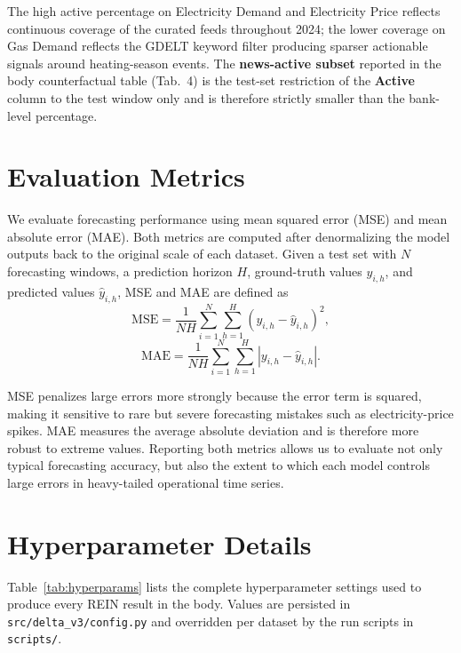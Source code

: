 \documentclass{article}
\newcommand{\method}{REIN\xspace}
\begin{document}
The high active percentage on Electricity Demand and Electricity Price reflects continuous coverage of the curated feeds throughout 2024; the lower coverage on Gas Demand reflects the GDELT keyword filter producing sparser actionable signals around heating-season events. The \textbf{news-active subset} reported in the body counterfactual table (Tab.~4) is the test-set restriction of the \textbf{Active} column to the test window only and is therefore strictly smaller than the bank-level percentage.
\section{Evaluation Metrics}
\label{app:evaluation}
We evaluate forecasting performance using mean squared error (MSE) and mean absolute error (MAE). 
Both metrics are computed after denormalizing the model outputs back to the original scale of each dataset. 
Given a test set with $N$ forecasting windows, a prediction horizon $H$, ground-truth values $y_{i,h}$, and predicted values $\hat{y}_{i,h}$, MSE and MAE are defined as
\[
\mathrm{MSE}
=
\frac{1}{NH}
\sum_{i=1}^{N}
\sum_{h=1}^{H}
\left(y_{i,h}-\hat{y}_{i,h}\right)^2,
\]
\[
\mathrm{MAE}
=
\frac{1}{NH}
\sum_{i=1}^{N}
\sum_{h=1}^{H}
\left|y_{i,h}-\hat{y}_{i,h}\right|.
\]

MSE penalizes large errors more strongly because the error term is squared, making it sensitive to rare but severe forecasting mistakes such as electricity-price spikes. MAE measures the average absolute deviation and is therefore more robust to extreme values. Reporting both metrics allows us to evaluate not only typical forecasting accuracy, but also the extent to which each model controls large errors in heavy-tailed operational time series.

\section{Hyperparameter Details}
\label{app:hyperparams}

Table~\ref{tab:hyperparams} lists the complete hyperparameter settings used to produce every \method result in the body. Values are persisted in \texttt{src/delta\_v3/config.py} and overridden per dataset by the run scripts in \texttt{scripts/}.
\end{document}
